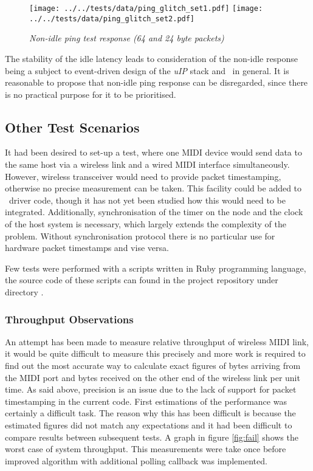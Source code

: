 \begin{figure}
\centering
\texttt{[image: ../../tests/data/ping\_glitch\_set1.pdf]}
\texttt{[image: ../../tests/data/ping\_glitch\_set2.pdf]}
\caption{\emph{Non-idle ping test response (64 and 24 byte packets)}}\label{ping:glitch}
\end{figure}

  The stability of the idle latency leads to consideration of the non-idle
 response being a subject to event-driven design of the \emph{uIP} stack and
 \ContikiOS\ in general. It is reasonable to propose that non-idle ping response
 can be disregarded, since there is no practical purpose for it to be prioritised.


\subsection{Other Test Scenarios}

  It had been desired to set-up a test, where one MIDI device would send
 data to the same host via a wireless link and a wired MIDI interface
 simultaneously. However, wireless transceiver would need to provide packet
 timestamping, otherwise no precise measurement can be taken. This facility
 could be added to \MCX\ driver code, though it has not yet been studied
 how this would need to be integrated. Additionally, synchronisation of the
 timer on the node and the clock of the host system is necessary, which
 largely extends the complexity of the problem. Without synchronisation
 protocol there is no particular use for hardware packet timestamps and
 vise versa.

 Few tests were performed with a scripts written in Ruby programming language,
 the source code of these scripts can found in the project repository under
 directory .

 
\subsubsection{Throughput Observations}

  An attempt has been made to measure relative throughput of wireless MIDI
 link, it would be quite difficult to measure this precisely and more work
 is required to find out the most accurate way to calculate exact figures
 of bytes arriving from the MIDI port and bytes received on the other end
 of the wireless link per unit time. As said above, precision is an issue
 due to the lack of support for packet timestamping in the current code.
 First estimations of the performance was certainly a difficult task.
 The reason why this has been difficult is because the estimated figures
 did not match any expectations and it had been difficult to compare
 results between subsequent tests. A graph in figure \ref{fig:fail}
 shows the worst case of system throughput. This measurements were take
 once before improved algorithm with additional polling callback was
 implemented.

